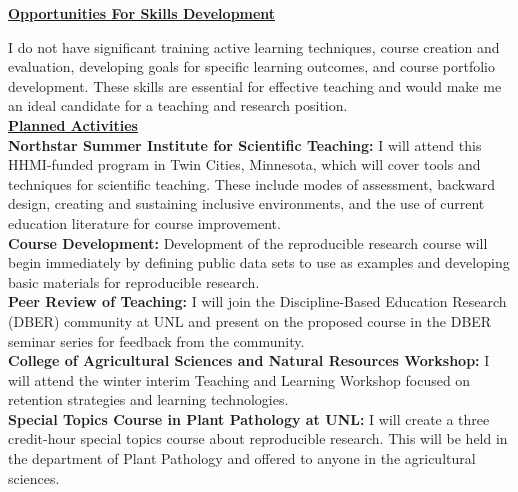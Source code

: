 \documentclass[12pt,letterpaper]{article}
\begin{document}


\noindent \textbf{\underline{Opportunities For Skills Development}}

I do not have significant training active learning techniques, course creation and evaluation, developing goals for specific learning outcomes, and course portfolio development. 
These skills are essential for effective teaching and would make me an ideal candidate for a teaching and research position.\\

\noindent \textbf{\underline{Planned Activities}}\\
\noindent \textbf{Northstar Summer Institute for Scientific Teaching:} I will attend this HHMI-funded program in Twin Cities, Minnesota, which will cover tools and techniques for scientific teaching. These include modes of assessment, backward design, creating and sustaining inclusive environments, and the use of current education literature for course improvement.\\
\noindent \textbf{Course Development:} Development of the reproducible research course will begin immediately by defining public data sets to use as examples and developing basic materials for reproducible research.\\
\noindent \textbf{Peer Review of Teaching:} I will join the Discipline-Based Education Research (DBER) community at UNL and present on the proposed course in the DBER seminar series for feedback from the community.\\
\noindent \textbf{College of Agricultural Sciences and Natural Resources Workshop:} I will attend the winter interim Teaching and Learning Workshop focused on retention strategies and learning technologies.\\
\noindent \textbf{Special Topics Course in Plant Pathology at UNL:} I will create a three credit-hour special topics course about reproducible research. This will be held in the department of Plant Pathology and offered to anyone in the agricultural sciences. \\
\end{document}
